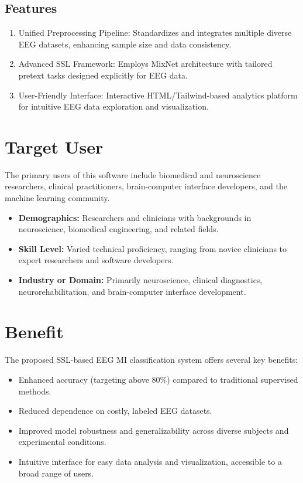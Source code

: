 \subsection{Features}
\label{subsec:features}

\begin{enumerate}[leftmargin=80pt]
    \item Unified Preprocessing Pipeline: Standardizes and integrates multiple diverse EEG datasets, enhancing sample size and data consistency.
    \item Advanced SSL Framework: Employs MixNet architecture with tailored pretext tasks designed explicitly for EEG data.
    \item User-Friendly Interface: Interactive HTML/Tailwind-based analytics platform for intuitive EEG data exploration and visualization.
\end{enumerate}


\section{Target User}
\label{sec:target-user}

The primary users of this software include biomedical and neuroscience researchers, clinical practitioners, brain-computer interface developers, and the machine learning community.

\begin{itemize}
    \item \textbf{Demographics:} Researchers and clinicians with backgrounds in neuroscience, biomedical engineering, and related fields.
    \item \textbf{Skill Level:} Varied technical proficiency, ranging from novice clinicians to expert researchers and software developers.
    \item \textbf{Industry or Domain:} Primarily neuroscience, clinical diagnostics, neurorehabilitation, and brain-computer interface development.
\end{itemize}


\section{Benefit}
\label{sec:benefit}

The proposed SSL-based EEG MI classification system offers several key benefits:

\begin{itemize}
    \item Enhanced accuracy (targeting above 80\%) compared to traditional supervised methods.
    \item Reduced dependence on costly, labeled EEG datasets.
    \item Improved model robustness and generalizability across diverse subjects and experimental conditions.
    \item Intuitive interface for easy data analysis and visualization, accessible to a broad range of users.
\end{itemize}


